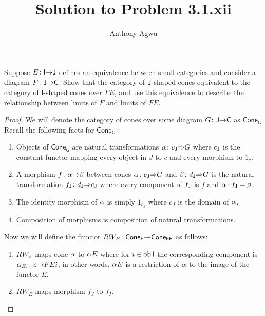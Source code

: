 \documentclass{article}
\title{Solution to Problem 3.1.xii}
\author{Anthony Agwu}
\begin{document}
	\maketitle
	
	
	\begin{exercise}
		Suppose ${E}\colon{\mathsf{I}}{\to}{\mathsf{J}}$ defines an equivalence between 
		small categories and consider a diagram ${F}\colon{\mathsf{J}}{\to}{\mathsf{C}}$. 
		Show that the category of $\mathsf{J}$-shaped cones equivalent to the category 
		of $\mathsf{I}$-shaped cones over $FE$, and use this equivalence to 
		describe the relationship between limits of $F$ and limits of $FE$.
	
		
	\end{exercise}
	
	
	\begin{proof}
		
	We will denote the category of cones over some diagram ${G}\colon{\mathsf{J}}{\to}{\mathsf{C}}$ 
	as $\mathsf{Cone_{G}}$  Recall the following facts for $\mathsf{Cone_{G}}$ :
	
	\begin{enumerate}
		\item Objects of $\mathsf{Cone_{G}}$ are natural transformations 
		${\alpha}\colon{c_{\mathsf{J}} }{\Rightarrow}{G}$ where $c_{\mathsf{J}}$ is the constant functor 
		mapping every object in $J$ to $c$ and every morphism to $1_{c}$.
		
		\item A morphism ${f}\colon{\alpha}{\to}{\beta}$ between cones ${\alpha}\colon{c_{\mathsf{J}} 
		}{\Rightarrow}{G}$ and ${\beta}\colon{d_{\mathsf{J}} }{\Rightarrow}{G}$ is the natural transformation 
	${ f_{\mathsf{J}} }\colon{d_{\mathsf{J}}}{\Rightarrow}{c_{\mathsf{J}}}$ where every component of $f_{\mathsf{J}}$ is 
	$f$ and $\alpha \cdot f_{\mathsf{J}} = \beta$.
	
	\item The identity morphism of $\alpha$ is simply $1_{c_J}$ where $c_{J}$ is 
	the domain of $\alpha$.
	\item Composition of morphisms is composition of natural transformations.	
	\end{enumerate}
		
		Now we will define the functor 
		${RW_{E}}\colon{\mathsf{Cone_{F}}}{\to}{\mathsf{Cone_{FE}}}$ as follows:
		
			
		\begin{enumerate}
			
			\item $RW_{E}$ maps cone $\alpha$ to $\alpha E$ where for $i \in 
			\operatorname{ob}\mathsf{I} $ the corresponding component is 
			${\alpha_{Ei}}\colon{c}{\to}{FEi}$, in other words, $\alpha E$ is a restriction 
			of $\alpha$ to the image of the functor $E$.
			\item $RW_{E}$ maps morphism $f_{J}$ to $f_{I}$.
			

\end{enumerate}
\end{proof}
\end{document}
